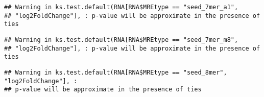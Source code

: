 \documentclass[
]{article}
\newenvironment{Shaded}{\begin{snugshade}}{\end{snugshade}}
\newcommand{\FunctionTok}[1]{\textcolor[rgb]{0.13,0.29,0.53}{\textbf{#1}}}
\newcommand{\NormalTok}[1]{#1}
\newcommand{\OtherTok}[1]{\textcolor[rgb]{0.56,0.35,0.01}{#1}}
\newcommand{\SpecialCharTok}[1]{\textcolor[rgb]{0.81,0.36,0.00}{\textbf{#1}}}
\newcommand{\StringTok}[1]{\textcolor[rgb]{0.31,0.60,0.02}{#1}}
\begin{document}
\begin{Shaded}
\end{Shaded}

\begin{verbatim}
## Warning in ks.test.default(RNA[RNA$MREtype == "seed_7mer_a1",
## "log2FoldChange"], : p-value will be approximate in the presence of ties
\end{verbatim}

\begin{Shaded}
\end{Shaded}

\begin{verbatim}
## Warning in ks.test.default(RNA[RNA$MREtype == "seed_7mer_m8",
## "log2FoldChange"], : p-value will be approximate in the presence of ties
\end{verbatim}

\begin{Shaded}
\end{Shaded}

\begin{verbatim}
## Warning in ks.test.default(RNA[RNA$MREtype == "seed_8mer", "log2FoldChange"], :
## p-value will be approximate in the presence of ties
\end{verbatim}
\end{document}

